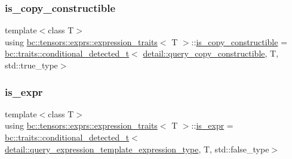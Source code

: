 \mbox{\label{structbc_1_1tensors_1_1exprs_1_1expression__traits_a1d26ea54c18b367ffb22646e46ad2872}} 
\subsubsection{\texorpdfstring{is\+\_\+copy\+\_\+constructible}{is\_copy\_constructible}}
{\footnotesize\ttfamily template$<$class T$>$ \\
using \hyperlink{structbc_1_1tensors_1_1exprs_1_1expression__traits}{bc\+::tensors\+::exprs\+::expression\+\_\+traits}$<$ T $>$\+::\hyperlink{structbc_1_1tensors_1_1exprs_1_1expression__traits_a1d26ea54c18b367ffb22646e46ad2872}{is\+\_\+copy\+\_\+constructible} =  \hyperlink{namespacebc_1_1traits_a1a6d378947ec32acd457890854bcd592}{bc\+::traits\+::conditional\+\_\+detected\+\_\+t}$<$ \hyperlink{namespacebc_1_1tensors_1_1exprs_1_1detail_abac935bf36b4924c73532023e11f75c2}{detail\+::query\+\_\+copy\+\_\+constructible}, T, std\+::true\+\_\+type$>$}

\mbox{\label{structbc_1_1tensors_1_1exprs_1_1expression__traits_aa6285131817b13ba8776a246b318cff4}} 
\subsubsection{\texorpdfstring{is\+\_\+expr}{is\_expr}}
{\footnotesize\ttfamily template$<$class T$>$ \\
using \hyperlink{structbc_1_1tensors_1_1exprs_1_1expression__traits}{bc\+::tensors\+::exprs\+::expression\+\_\+traits}$<$ T $>$\+::\hyperlink{structbc_1_1tensors_1_1exprs_1_1expression__traits_aa6285131817b13ba8776a246b318cff4}{is\+\_\+expr} =  \hyperlink{namespacebc_1_1traits_a1a6d378947ec32acd457890854bcd592}{bc\+::traits\+::conditional\+\_\+detected\+\_\+t}$<$ \hyperlink{namespacebc_1_1tensors_1_1exprs_1_1detail_a8daec353fcf1440e3e610f412a2228d8}{detail\+::query\+\_\+expression\+\_\+template\+\_\+expression\+\_\+type}, T, std\+::false\+\_\+type$>$}

